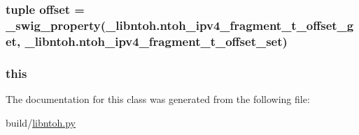 \hypertarget{classlibntoh_1_1ntoh__ipv4__fragment__t_a03fbaceb13719d1bc975d26c3b92761a}{
\subsubsection[{offset}]{\setlength{\rightskip}{0pt plus 5cm}tuple offset = {\bf \-\_\-swig\-\_\-property}(\-\_\-libntoh.\-ntoh\-\_\-ipv4\-\_\-fragment\-\_\-t\-\_\-offset\-\_\-get, \-\_\-libntoh.\-ntoh\-\_\-ipv4\-\_\-fragment\-\_\-t\-\_\-offset\-\_\-set)\hspace{0.3cm}{\ttfamily [static]}}}\label{classlibntoh_1_1ntoh__ipv4__fragment__t_a03fbaceb13719d1bc975d26c3b92761a}
\hypertarget{classlibntoh_1_1ntoh__ipv4__fragment__t_a05c09a5e9d53fa7adf0a7936038c2fa3}{
\subsubsection[{this}]{\setlength{\rightskip}{0pt plus 5cm}this}}\label{classlibntoh_1_1ntoh__ipv4__fragment__t_a05c09a5e9d53fa7adf0a7936038c2fa3}


The documentation for this class was generated from the following file\-:\begin{DoxyCompactItemize}
\item 
build/\hyperlink{libntoh_8py}{libntoh.\-py}\end{DoxyCompactItemize}
